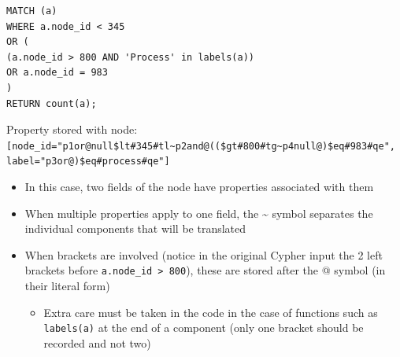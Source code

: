 \documentclass[letterpaper]{ltxdoc}
\begin{document}
\bigskip
\newpage

\begin{lstlisting}[language=Cypher]
MATCH (a)
WHERE a.node_id < 345
OR (
(a.node_id > 800 AND 'Process' in labels(a))
OR a.node_id = 983
)
RETURN count(a);
\end{lstlisting}

Property stored with node:
\texttt{[node\_id="p1or@null\$lt\#345\#tl\textasciitilde p2and@((\$gt\#800\#tg\textasciitilde p4null@)\$eq\#983\#qe", label="p3or@)\$eq\#process\#qe"]}

\begin{itemize}
\item In this case, two fields of the node have properties associated with them
\item When multiple properties apply to one field, the \textasciitilde {} symbol separates the individual components that will be translated
\item When brackets are involved (notice in the original Cypher input the 2 left brackets before \texttt{a.node\_id > 800}), these are stored after the @ symbol (in their literal form)
\begin{itemize}
\item Extra care must be taken in the code in the case of functions such as \texttt{labels(a)} at the end of a component (only one bracket should be recorded and not two)
\end{itemize}
\end{itemize}
\end{document}
